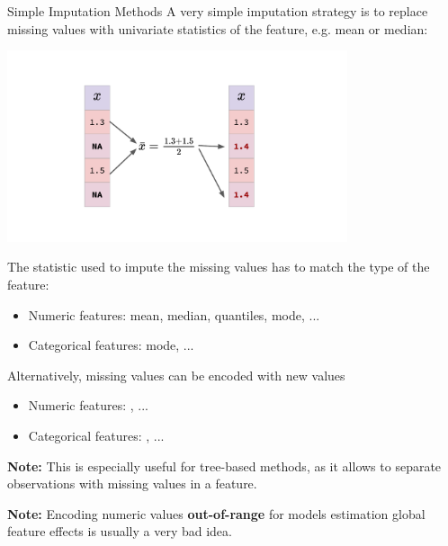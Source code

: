 \begin{vbframe}{Simple Imputation Methods}
A very simple imputation strategy is to replace missing values with univariate statistics of the feature, e.g. mean or median:
\begin{center}
\includegraphics[width = 10cm]{figure_man/fe_imputation_simple.pdf}
\end{center}
\framebreak

The statistic used to impute the missing values has to match the type of the feature:
\begin{itemize}
\item Numeric features: mean, median, quantiles, mode, ...
\item Categorical features: mode, ...
\end{itemize}
\vspace{+.4cm}
Alternatively, missing values can be encoded with new values
\begin{itemize}
\item Numeric features: , ...
\item Categorical features: , ...
\end{itemize}
\vspace{+.4cm}
\textbf{Note:} This is especially useful for tree-based methods, as it allows to separate observations with missing values in a feature.

\vspace*{0.2cm}

\textbf{Note:} Encoding numeric values \textbf{out-of-range} for models estimation global feature effects is usually a very bad idea.
\end{vbframe}

